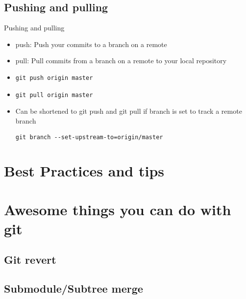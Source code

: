 \documentclass[10pt,a4paper]{beamer}
\begin{document}
\subsection{Pushing and pulling}
\begin{frame}[fragile]{Pushing and pulling}
\begin{itemize}
\item push: Push your commits to a branch on a remote
\item pull: Pull commits from a branch on a remote to your local repository
\item \begin{verbatim}git push origin master\end{verbatim}
\item \begin{verbatim}git pull origin master\end{verbatim}
\item Can be shortened to git push and git pull if branch is set to track a remote branch
\begin{verbatim}git branch --set-upstream-to=origin/master\end{verbatim}
\end{itemize}
\end{frame}


\section{Best Practices and tips}
\begin{frame}

\end{frame}


\section{Awesome things you can do with git}

\subsection{Git revert}
\begin{frame}

\end{frame}

\subsection{Submodule/Subtree merge}
\begin{frame}

\end{frame}
\end{document}
